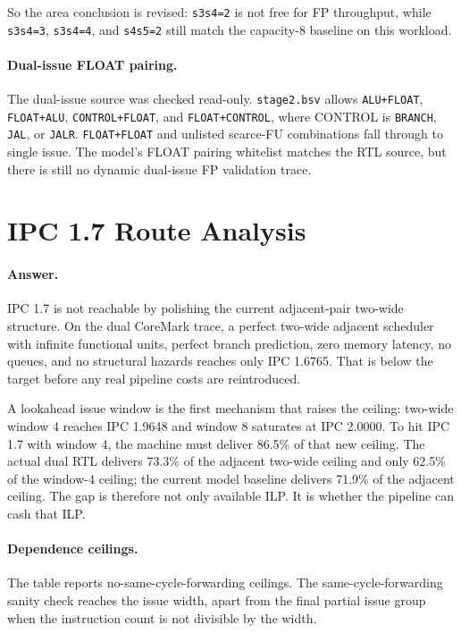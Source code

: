 \documentclass[10pt]{article}
\begin{document}
So the area conclusion is revised: \texttt{s3s4=2} is not free for FP
throughput, while \texttt{s3s4=3}, \texttt{s3s4=4}, and \texttt{s4s5=2} still
match the capacity-8 baseline on this workload.

\paragraph{Dual-issue FLOAT pairing.}
The dual-issue source was checked read-only. \texttt{stage2.bsv} allows
\texttt{ALU+FLOAT}, \texttt{FLOAT+ALU}, \texttt{CONTROL+FLOAT}, and
\texttt{FLOAT+CONTROL}, where CONTROL is \texttt{BRANCH}, \texttt{JAL}, or
\texttt{JALR}. \texttt{FLOAT+FLOAT} and unlisted scarce-FU combinations fall
through to single issue. The model's FLOAT pairing whitelist matches the RTL
source, but there is still no dynamic dual-issue FP validation trace.

\section*{IPC 1.7 Route Analysis}

\paragraph{Answer.}
IPC 1.7 is not reachable by polishing the current adjacent-pair two-wide
structure. On the dual CoreMark trace, a perfect two-wide adjacent scheduler
with infinite functional units, perfect branch prediction, zero memory latency,
no queues, and no structural hazards reaches only IPC 1.6765. That is below the
target before any real pipeline costs are reintroduced.

A lookahead issue window is the first mechanism that raises the ceiling:
two-wide window 4 reaches IPC 1.9648 and window 8 saturates at IPC 2.0000. To
hit IPC 1.7 with window 4, the machine must deliver 86.5\% of that new ceiling.
The actual dual RTL delivers 73.3\% of the adjacent two-wide ceiling and only
62.5\% of the window-4 ceiling; the current model baseline delivers 71.9\% of
the adjacent ceiling. The gap is therefore not only available ILP. It is whether
the pipeline can cash that ILP.

\paragraph{Dependence ceilings.}
The table reports no-same-cycle-forwarding ceilings. The same-cycle-forwarding
sanity check reaches the issue width, apart from the final partial issue group
when the instruction count is not divisible by the width.
\end{document}
